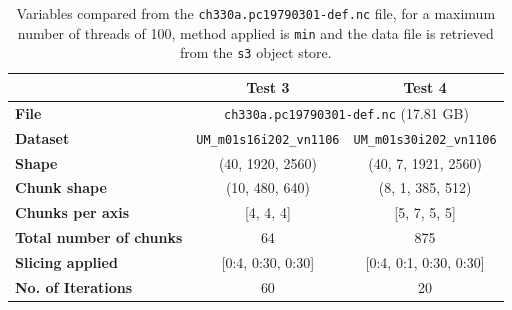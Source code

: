 \documentclass{article}
\begin{document}
\begin{table}[h!] 
    \centering 
    \begin{tabular}{lcc}  \hline
                                        & Test 3                            & Test 4                              \\ \hline
        \textbf{File}                   & \multicolumn{2}{c}{ \texttt{ch330a.pc19790301-def.nc} (17.81  GB)}      \\                                       
        \textbf{Dataset}                & \texttt{UM\_m01s16i202\_vn1106}   & \texttt{UM\_m01s30i202\_vn1106}     \\ 
        \textbf{Shape}                  & (40, 1920, 2560)                  & (40, 7, 1921, 2560)                 \\ 
        \textbf{Chunk shape}            & (10, 480, 640)                    & (8, 1, 385, 512)                    \\ 
        \textbf{Chunks per axis}        & [4, 4, 4]                         & [5, 7, 5, 5]                        \\ 
        \textbf{Total number of chunks} & 64                                & 875                                 \\ 
        \textbf{Slicing applied}        & [0:4, 0:30, 0:30]                 &[0:4, 0:1, 0:30, 0:30]               \\ 
        \textbf{No. of Iterations}      & 60                                & 20                                  \\  \hline
    \end{tabular} 
    \caption{Variables compared from the \texttt{ch330a.pc19790301-def.nc} file, for a maximum number of threads of 100, method applied is \texttt{min} and the data file is retrieved from the \texttt{s3} object store.} 
    \label{tab:T3T4_Conditions} 
\end{table}
\end{document}
